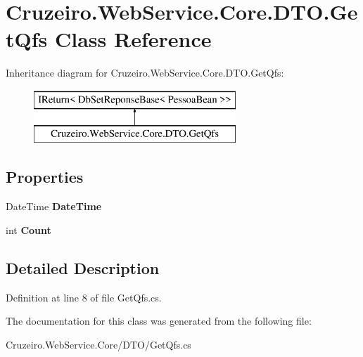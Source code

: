 \hypertarget{class_cruzeiro_1_1_web_service_1_1_core_1_1_d_t_o_1_1_get_qfs}{}\section{Cruzeiro.\+Web\+Service.\+Core.\+D\+T\+O.\+Get\+Qfs Class Reference}
\label{class_cruzeiro_1_1_web_service_1_1_core_1_1_d_t_o_1_1_get_qfs}
Inheritance diagram for Cruzeiro.\+Web\+Service.\+Core.\+D\+T\+O.\+Get\+Qfs\+:\begin{figure}[H]
\begin{center}
\leavevmode
\includegraphics[height=2.000000cm]{class_cruzeiro_1_1_web_service_1_1_core_1_1_d_t_o_1_1_get_qfs}
\end{center}
\end{figure}
\subsection*{Properties}
\begin{DoxyCompactItemize}
\item 
Date\+Time {\bfseries Date\+Time}\hypertarget{class_cruzeiro_1_1_web_service_1_1_core_1_1_d_t_o_1_1_get_qfs_a9c8a3410ac7082628e9cbdb191a7114c}{}\label{class_cruzeiro_1_1_web_service_1_1_core_1_1_d_t_o_1_1_get_qfs_a9c8a3410ac7082628e9cbdb191a7114c}

\item 
int {\bfseries Count}\hypertarget{class_cruzeiro_1_1_web_service_1_1_core_1_1_d_t_o_1_1_get_qfs_a292cc155596b9151e87d1b3cad2564b9}{}\label{class_cruzeiro_1_1_web_service_1_1_core_1_1_d_t_o_1_1_get_qfs_a292cc155596b9151e87d1b3cad2564b9}

\end{DoxyCompactItemize}


\subsection{Detailed Description}


Definition at line 8 of file Get\+Qfs.\+cs.



The documentation for this class was generated from the following file\+:\begin{DoxyCompactItemize}
\item 
Cruzeiro.\+Web\+Service.\+Core/\+D\+T\+O/Get\+Qfs.\+cs\end{DoxyCompactItemize}
